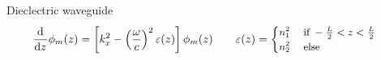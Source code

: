 \begin{frame}{Dieclectric waveguide}
  \vspace{-2.5mm}
  \begin{equation*}
    \hspace{-0.35cm}\dv[]{}{z}\phi_m(z)=\left[k_{x}^2-\left(\frac{\omega}{c}\right)^2\varepsilon(z)\right]\phi_m(z)\qquad\varepsilon(z)={\small\begin{cases}n_1^2&\;\text{if}\;-\frac{L}{2}<z<\frac{L}{2}\\n_2^2&\;\text{else}\end{cases}}
  \end{equation*}
  \vfill
  \begin{figure}
    \centering
    \resizebox{\textwidth}{!}{
      
    }
  \end{figure}
\end{frame}

